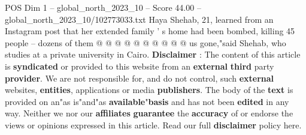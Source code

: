 \begin{textsample}{POS Dim 1 – global\_north\_2023\_10 – Score 44.00 – global\_north\_2023\_10/102773033.txt}
Haya Shehab, 21, learned from an Instagram post that her extended family ' s home had been bombed, killing 45 people -- dozens of them @ @ @ @ @ @ @ @ @ @ us gone,"said Shehab, who studies at a private university in Cairo. \textbf{Disclaimer} : The content of this article is \textbf{syndicated} or provided to this website from an \textbf{external} \textbf{third} party \textbf{provider}.
We are not responsible for, and do not control, such \textbf{external} websites, \textbf{entities}, applications or media \textbf{publishers}.
The body of the \textbf{text} is provided on an"as is"and"as \textbf{available}"\textbf{basis} and has not been \textbf{edited} in any way.
Neither we nor our \textbf{affiliates} \textbf{guarantee} the \textbf{accuracy} of or endorse the views or opinions expressed in this article.
Read our full \textbf{disclaimer} policy here.

\end{textsample}
